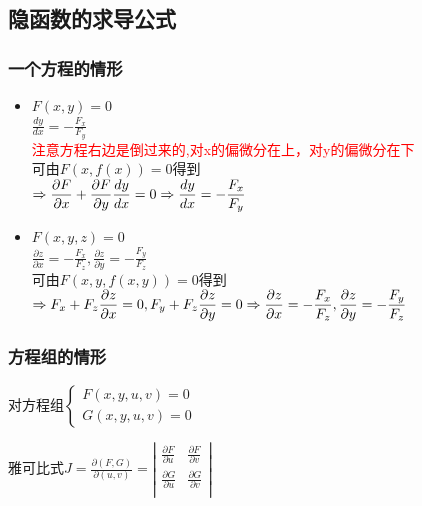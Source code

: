 \documentclass{article} %
\begin{document}
\subsection{隐函数的求导公式}
\subsubsection{一个方程的情形}
\begin{itemize}
    \item $F(x,y)=0$\vspace{1mm}\\
        $\displaystyle
        \frac{dy}{dx}=-\frac{F_x}{F_y}
        $\vspace{1mm}\\
        \textcolor{red}{注意方程右边是倒过来的,对x的偏微分在上，对y的偏微分在下}\\
        可由$F(x,f(x))=0 $得到\vspace{1mm}\\
        $\displaystyle\Rightarrow \frac{\partial F}{\partial x}+\frac{\partial F}{\partial y}\frac{dy}{dx}=0\\
        \Rightarrow\frac{dy}{dx}=-\frac{F_x}{F_y}$
    \item $F(x,y,z)=0$\vspace{1mm}\\
        $\displaystyle
        \frac{\partial z}{\partial x}=-\frac{F_x}{F_z},
        \frac{\partial z}{\partial y}=-\frac{F_y}{F_z}
        $%
        \\
        可由$F(x,y,f(x,y))=0$得到\\
        $\displaystyle\Rightarrow F_x+F_z\frac{\partial z}{\partial x}=0,F_y+F_z\frac{\partial z}{\partial y}=0\\
        \Rightarrow
        \frac{\partial z}{\partial x}=-\frac{F_x}{F_z},
        \frac{\partial z}{\partial y}=-\frac{F_y}{F_z}
        $
\end{itemize}


\subsubsection{方程组的情形}
对方程组$\left\{
    \begin{array}{ll}
        F(x,y,u,v)=0\\
        G(x,y,u,v)=0
    \end{array}
\right.$\par
雅可比式$\displaystyle
J=\frac{\partial (F,G)}{\partial (u,v)}=\left|
\begin{array}{cc}
    \frac{\partial F}{\partial u} & \frac{\partial F}{\partial v} \\
    \frac{\partial G}{\partial u} & \frac{\partial G}{\partial v} \\
\end{array}
\right|
$
\end{document}
